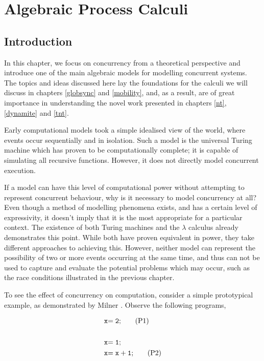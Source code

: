 
\chapter{Algebraic Process Calculi}
\label{apc}

\section{Introduction}

In this chapter, we focus on concurrency from a theoretical
perspective and introduce one of the main algebraic models for
modelling concurrent systems.  The topics and ideas discussed here lay
the foundations for the calculi we will discuss in chapters
\ref{globsync} and \ref{mobility}, and, as a result, are of great
importance in understanding the novel work presented in chapters
\ref{nt}, \ref{dynamite} and \ref{tnt}.

Early computational models took a simple idealised view of the world,
where events occur sequentially and in isolation.  Such a model is the
universal Turing machine \cite{turing:36} which has proven to be
computationally complete; it is capable of simulating all recursive
functions.  However, it does not directly model concurrent execution.

If a model can have this level of computational power without
attempting to represent concurrent behaviour, why is it necessary to
model concurrency at all?  Even though a method of modelling phenomena
exists, and has a certain level of expressivity, it doesn't imply that
it is the most appropriate for a particular context.  The existence of
both Turing machines and the $\lambda$ calculus already demonstrates
this point.  While both have proven equivalent in power, they take
different approaches to achieving this.  However, neither model can
represent the possibility of two or more events occurring at the same
time, and thus can not be used to capture and evaluate the potential
problems which may occur, such as the race conditions illustrated in
the previous chapter.

To see the effect of concurrency on computation, consider a simple
prototypical example, as demonstrated by Milner \cite{milner:lecture}.
Observe the following programs,

\begin{align*}
\mathtt{x} & \mathtt{= 2;}\tag{P1} \\
\\
\mathtt{x} & \mathtt{= 1;}\notag \\
\mathtt{x} & \mathtt{= x + 1;}\tag{P2}
\end{align*}

